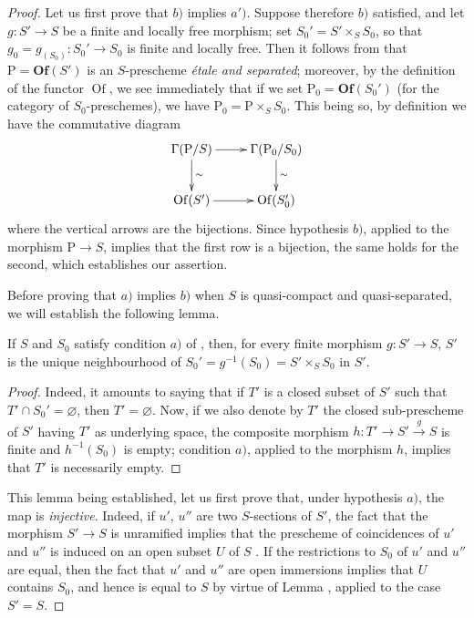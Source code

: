 \begin{proof}
Let us first prove that $b)$ implies $a')$.
Suppose therefore $b)$ satisfied, and let $g:S'\to S$ be a finite and locally free morphism;
set $S_0'=S'\times_S S_0$, so that $g_0=g_{(S_0)}:S_0'\to S_0$ is finite and locally free.
Then it follows from  that $\mathrm{P}=\mathbf{Of}(S')$ is an $S$-prescheme \emph{\'etale and separated};
moreover, by the definition of the functor $\operatorname{Of}$, we see immediately that if we set $\mathrm{P}_0=\mathbf{Of}(S_0')$ (for the category of $S_0$-preschemes), we have $\mathrm{P}_0=\mathrm{P}\times_S S_0$.
This being so, by definition we have the commutative diagram
\[
\xymatrix{
\Gamma(\mathrm{P}/S)\ar[r]\ar[d]^{\sim} & \Gamma(\mathrm{P}_0/S_0)\ar[d]^{\sim}\\
\operatorname{Of}(S')\ar[r] & \operatorname{Of}(S_0')
}
\]
where the vertical arrows are the bijections.
Since hypothesis $b)$, applied to the morphism $\mathrm{P}\to S$, implies that the first row is a bijection, the same holds for the second, which establishes our assertion.

Before proving that $a)$ implies $b)$ when $S$ is quasi-compact and quasi-separated, we will establish the following lemma.

\begin{lemma}[18.5.4.3]
\label{IV.18.5.4.3}
If $S$ and $S_0$ satisfy condition $a)$ of , then, for every finite morphism $g:S'\to S$, $S'$ is the unique neighbourhood of $S_0'=g^{-1}(S_0)=S'\times_S S_0$ in $S'$.
\end{lemma}

\begin{proof}
Indeed, it amounts to saying that if $T'$ is a closed subset of $S'$ such that $T'\cap S_0'=\varnothing$, then $T'=\varnothing$.
Now, if we also denote by $T'$ the closed sub-prescheme of $S'$ having $T'$ as underlying space, the composite morphism $h:T'\to S'\xrightarrow{g}S$ is finite and $h^{-1}(S_0)$ is empty;
condition $a)$, applied to the morphism $h$, implies that $T'$ is necessarily empty.
\end{proof}

This lemma being established, let us first prove that, under hypothesis $a)$, the map  is \emph{injective}.
Indeed, if $u'$, $u''$ are two $S$-sections of $S'$, the fact that the morphism $S'\to S$ is unramified implies that the prescheme of coincidences of $u'$ and $u''$ is induced on an open subset $U$ of $S$ .
If the restrictions to $S_0$ of $u'$ and $u''$ are equal, then the fact that $u'$ and $u''$ are open immersions  implies that $U$ contains $S_0$, and hence is equal to $S$ by virtue of Lemma , applied to the case $S'=S$.


\end{proof}
